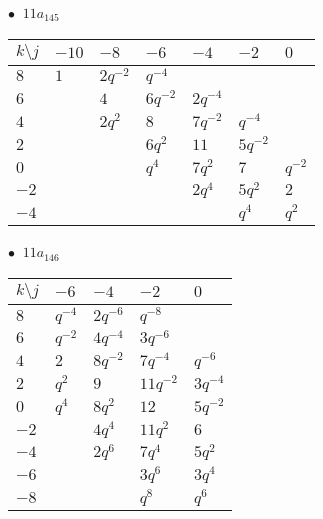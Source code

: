 \begin{minipage}{\linewidth}
$\bullet\ $ $11a_{145}$ \vspace{0.5em} \\
\begin{tabular}{l|llllll}
$k \setminus j$ & $-10$ & $-8$ & $-6$ & $-4$ & $-2$ & $0$ \\
\hline
$8$ & $1$ & $2q^{-2}$ & $q^{-4}$ &  &  &  \\
$6$ &  & $4$ & $6q^{-2}$ & $2q^{-4}$ &  &  \\
$4$ &  & $2q^{2}$ & $8$ & $7q^{-2}$ & $q^{-4}$ &  \\
$2$ &  &  & $6q^{2}$ & $11$ & $5q^{-2}$ &  \\
$0$ &  &  & $q^{4}$ & $7q^{2}$ & $7$ & $q^{-2}$ \\
$-2$ &  &  &  & $2q^{4}$ & $5q^{2}$ & $2$ \\
$-4$ &  &  &  &  & $q^{4}$ & $q^{2}$ \\
\end{tabular}
\vspace{2em}
\end{minipage}
%
\begin{minipage}{\linewidth}
$\bullet\ $ $11a_{146}$ \vspace{0.5em} \\
\begin{tabular}{l|llll}
$k \setminus j$ & $-6$ & $-4$ & $-2$ & $0$ \\
\hline
$8$ & $q^{-4}$ & $2q^{-6}$ & $q^{-8}$ &  \\
$6$ & $q^{-2}$ & $4q^{-4}$ & $3q^{-6}$ &  \\
$4$ & $2$ & $8q^{-2}$ & $7q^{-4}$ & $q^{-6}$ \\
$2$ & $q^{2}$ & $9$ & $11q^{-2}$ & $3q^{-4}$ \\
$0$ & $q^{4}$ & $8q^{2}$ & $12$ & $5q^{-2}$ \\
$-2$ &  & $4q^{4}$ & $11q^{2}$ & $6$ \\
$-4$ &  & $2q^{6}$ & $7q^{4}$ & $5q^{2}$ \\
$-6$ &  &  & $3q^{6}$ & $3q^{4}$ \\
$-8$ &  &  & $q^{8}$ & $q^{6}$ \\
\end{tabular}
\vspace{2em}
\end{minipage}
%
